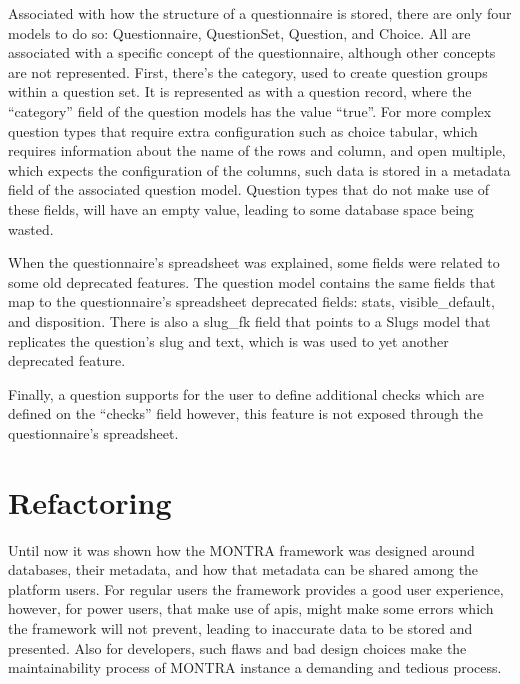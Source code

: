 Associated with how the structure of a questionnaire is stored, there are only four models to do so: Questionnaire, QuestionSet, Question, and Choice.
All are associated with a specific concept of the questionnaire, although other concepts are not represented.
First, there's the category, used to create question groups within a question set.
It is represented as with a question record, where the ``category'' field of the question models has the value ``true''.
For more complex question types that require extra configuration such as choice tabular, which requires information about the name of the rows and column, and open multiple, which expects the configuration of the columns, such data is stored in a metadata field of the associated question model.
Question types that do not make use of these fields, will have an empty value, leading to some database space being wasted.

When the questionnaire's spreadsheet was explained, some fields were related to some old deprecated features.
The question model contains the same fields that map to the questionnaire's spreadsheet deprecated fields: stats, visible\_default, and disposition.
There is also a slug\_fk field that points to a Slugs model that replicates the question's slug and text, which is was used to yet another deprecated feature.

Finally, a question supports for the user to define additional checks which are defined on the ``checks'' field however, this feature is not exposed through the questionnaire's spreadsheet.

\section{Refactoring}


Until now it was shown how the MONTRA framework was designed around databases, their metadata, and how that metadata can be shared among the platform users.
For regular users the framework provides a good user experience, however, for power users, that make use of \gls{api}s, might make some errors which the framework will not prevent, leading to inaccurate data to be stored and presented.
Also for developers, such flaws and bad design choices make the maintainability process of MONTRA instance a demanding and tedious process.

